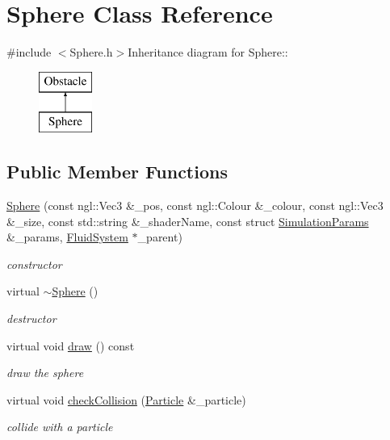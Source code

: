 \hypertarget{classSphere}{
\section{Sphere Class Reference}
\label{classSphere}
}


{\ttfamily \#include $<$Sphere.h$>$}Inheritance diagram for Sphere::\begin{figure}[H]
\begin{center}
\leavevmode
\includegraphics[height=2cm]{classSphere}
\end{center}
\end{figure}
\subsection*{Public Member Functions}
\begin{DoxyCompactItemize}
\item 
\hyperlink{classSphere_a6452552678bc35d4621e3ec9272d34a0}{Sphere} (const ngl::Vec3 \&\_\-pos, const ngl::Colour \&\_\-colour, const ngl::Vec3 \&\_\-size, const std::string \&\_\-shaderName, const struct \hyperlink{structSimulationParams}{SimulationParams} \&\_\-params, \hyperlink{classFluidSystem}{FluidSystem} $\ast$\_\-parent)
\begin{DoxyCompactList}\small\item\em constructor \item\end{DoxyCompactList}\item 
virtual \hyperlink{classSphere_a569c071e50a3e11f678630ee1a17737e}{$\sim$Sphere} ()
\begin{DoxyCompactList}\small\item\em destructor \item\end{DoxyCompactList}\item 
virtual void \hyperlink{classSphere_a75a92a2b70974147560dd8c0514b2652}{draw} () const 
\begin{DoxyCompactList}\small\item\em draw the sphere \item\end{DoxyCompactList}\item 
virtual void \hyperlink{classSphere_a0a18ee7f656154b8c1f60d99bb418c98}{checkCollision} (\hyperlink{classParticle}{Particle} \&\_\-particle)
\begin{DoxyCompactList}\small\item\em collide with a particle \item\end{DoxyCompactList}\end{DoxyCompactItemize}


